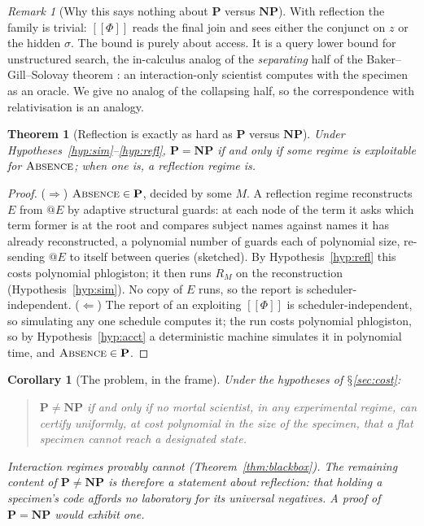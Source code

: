 \documentclass[11pt]{article}
\makeatletter
\theoremstyle{definition}
\theoremstyle{plain}
\newtheorem{theorem}[definition]{Theorem}
\newtheorem{corollary}[definition]{Corollary}
\theoremstyle{remark}
\newtheorem{remark}[definition]{Remark}
\newcommand{\quo}[1]{@#1}
\newcommand{\enc}[1]{[\![#1]\!]}
\DeclareRobustCommand{\S}{\ifmmode\mathsection\else$\mathsection$\fi}
\newcommand{\ABS}{\textup{\textsc{Absence}}}
\newcommand{\Pclass}{\mathbf{P}}
\newcommand{\NPclass}{\mathbf{NP}}
\makeatother
\begin{document}
\begin{remark}[Why this says nothing about $\Pclass$ versus $\NPclass$]
\label{rem:oracle}
With reflection the family is trivial: $\enc{\Phi}$ reads the final join
and sees either the conjunct on $z$ or the hidden $\sigma$. The bound is
purely about access. It is a query lower bound for unstructured search,
the in-calculus analog of the \emph{separating} half of the
Baker--Gill--Solovay theorem \cite{BGS75}: an interaction-only scientist
computes with the specimen as an oracle. We give no analog of the
collapsing half, so the correspondence with relativisation is an
analogy.
\end{remark}

\begin{theorem}[Reflection is exactly as hard as $\Pclass$ versus $\NPclass$]
\label{thm:whitebox}
Under Hypotheses~\ref{hyp:sim}--\ref{hyp:refl}, $\Pclass = \NPclass$ if
and only if some regime is exploitable for $\ABS$; when one is, a
reflection regime is.
\end{theorem}

\begin{proof}
($\Rightarrow$) $\ABS \in \Pclass$, decided by some $M$. A reflection
regime reconstructs $E$ from $\quo{E}$ by adaptive structural guards: at
each node of the term it asks which term former is at the root and
compares subject names against names it has already reconstructed, a
polynomial number of guards each of polynomial size, re-sending
$\quo{E}$ to itself between queries (sketched). By
Hypothesis~\ref{hyp:refl} this costs polynomial phlogiston; it then runs
$R_M$ on the reconstruction (Hypothesis~\ref{hyp:sim}). No copy of $E$
runs, so the report is scheduler-independent. ($\Leftarrow$) The report of an exploiting
$\enc{\Phi}$ is scheduler-independent, so simulating any one schedule
computes it; the run costs polynomial phlogiston, so by
Hypothesis~\ref{hyp:acct} a deterministic machine simulates it in
polynomial time, and $\ABS \in \Pclass$.
\end{proof}

\begin{corollary}[The problem, in the frame]\label{cor:restatement}
Under the hypotheses of \S\ref{sec:cost}:
\begin{quote}
$\Pclass \neq \NPclass$ if and only if no mortal scientist, in any
experimental regime, can certify uniformly, at cost polynomial in the
size of the specimen, that a flat specimen cannot reach a designated
state.
\end{quote}
Interaction regimes provably cannot (Theorem~\ref{thm:blackbox}). The
remaining content of $\Pclass \neq \NPclass$ is therefore a statement
about reflection: that holding a specimen's code affords no laboratory
for its universal negatives. A proof of $\Pclass = \NPclass$ would
exhibit one.
\end{corollary}
\end{document}
